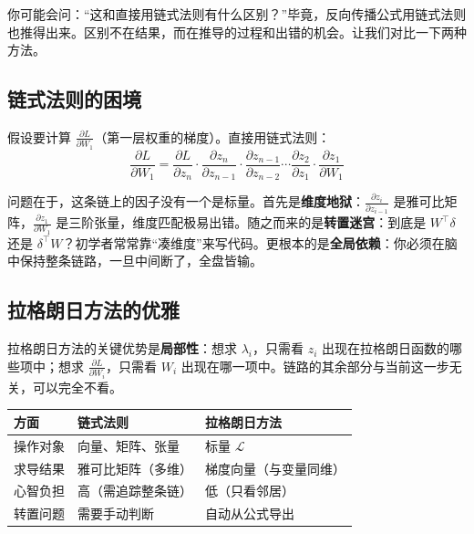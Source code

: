 你可能会问：``这和直接用链式法则有什么区别？''毕竟，反向传播公式用链式法则也推得出来。区别不在结果，而在推导的过程和出错的机会。让我们对比一下两种方法。

\subsection{链式法则的困境}

假设要计算 $\frac{\partial L}{\partial W_1}$（第一层权重的梯度）。直接用链式法则：
\begin{equation}
\frac{\partial L}{\partial W_1} = \frac{\partial L}{\partial z_n} \cdot \frac{\partial z_n}{\partial z_{n-1}} \cdot \frac{\partial z_{n-1}}{\partial z_{n-2}} \cdots \frac{\partial z_2}{\partial z_1} \cdot \frac{\partial z_1}{\partial W_1}
\end{equation}

问题在于，这条链上的因子没有一个是标量。首先是\textbf{维度地狱}：$\frac{\partial z_i}{\partial z_{i-1}}$ 是雅可比矩阵，$\frac{\partial z_1}{\partial W_1}$ 是三阶张量，维度匹配极易出错。随之而来的是\textbf{转置迷宫}：到底是 $W^\top \delta$ 还是 $\delta^\top W$？初学者常常靠``凑维度''来写代码。更根本的是\textbf{全局依赖}：你必须在脑中保持整条链路，一旦中间断了，全盘皆输。

\subsection{拉格朗日方法的优雅}

拉格朗日方法的关键优势是\textbf{局部性}：想求 $\lambda_i$，只需看 $z_i$ 出现在拉格朗日函数的哪些项中；想求 $\frac{\partial L}{\partial W_i}$，只需看 $W_i$ 出现在哪一项中。链路的其余部分与当前这一步无关，可以完全不看。

\begin{center}
\begin{tabular}{lll}
\toprule
\textbf{方面} & \textbf{链式法则} & \textbf{拉格朗日方法} \\
\midrule
操作对象 & 向量、矩阵、张量 & 标量 $\mathcal{L}$ \\
求导结果 & 雅可比矩阵（多维） & 梯度向量（与变量同维） \\
心智负担 & 高（需追踪整条链） & 低（只看邻居） \\
转置问题 & 需要手动判断 & 自动从公式导出 \\
\bottomrule
\end{tabular}
\end{center}

